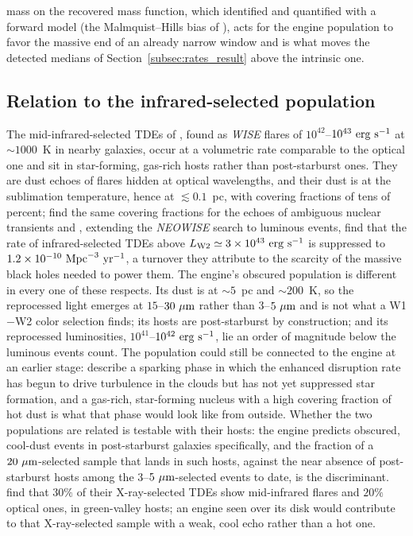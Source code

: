\documentclass[twocolumn,pdftex]{aastex701}
\newcommand{\um}{\mu{\rm m}\xspace}
\newcommand{\wise}{{\it WISE}\xspace}
\newcommand{\neowise}{{\it NEOWISE}\xspace}
\begin{document}
mass on the recovered mass function, which \citet{Ramsden:2022a} identified and \citet{Ramsden:2025a} quantified with a forward model (the Malmquist--Hills bias of \citealt{Mummery:2026a}), acts for the engine population to favor the massive end of an already narrow window and is what moves the detected medians of Section~\ref{subsec:rates_result} above the intrinsic one.

\subsection{Relation to the infrared-selected population}\label{subsec:irpop}

The mid-infrared-selected TDEs of \citet{Masterson:2024a}, found as \wise flares of $10^{42}$--$10^{43}~{\rm erg~s^{-1}}$ at $\sim 1000$~K in nearby galaxies, occur at a volumetric rate comparable to the optical one and sit in star-forming, gas-rich hosts rather than post-starburst ones. They are dust echoes of flares hidden at optical wavelengths, and their dust is at the sublimation temperature, hence at $\lesssim 0.1$~pc, with covering fractions of tens of percent; \citet{Hinkle:2024b} find the same covering fractions for the echoes of ambiguous nuclear transients and \citet{Nair:2026a}, extending the \neowise search to luminous events, find that the rate of infrared-selected TDEs above $L_{\rm W2} \simeq 3 \times 10^{43}~{\rm erg~s^{-1}}$ is suppressed to $1.2 \times 10^{-10}~{\rm Mpc}^{-3}~{\rm yr}^{-1}$, a turnover they attribute to the scarcity of the massive black holes needed to power them. The engine's obscured population is different in every one of these respects. Its dust is at $\sim 5$~pc and $\sim 200$~K, so the reprocessed light emerges at $15$--$30~\um$ rather than $3$--$5~\um$ and is not what a W1$-$W2 color selection finds; its hosts are post-starburst by construction; and its reprocessed luminosities, $10^{41}$--$10^{42}~{\rm erg~s^{-1}}$, lie an order of magnitude below the luminous events \citet{Nair:2026a} count. The \citet{Masterson:2024a} population could still be connected to the engine at an earlier stage: \citet{Guillochon:2026a} describe a sparking phase in which the enhanced disruption rate has begun to drive turbulence in the clouds but has not yet suppressed star formation, and a gas-rich, star-forming nucleus with a high covering fraction of hot dust is what that phase would look like from outside. Whether the two populations are related is testable with their hosts: the engine predicts obscured, cool-dust events in post-starburst galaxies specifically, and the fraction of a $20~\um$-selected sample that lands in such hosts, against the near absence of post-starburst hosts among the $3$--$5~\um$-selected events to date, is the discriminant. \citet{Grotova:2025a} find that $30\%$ of their X-ray-selected TDEs show mid-infrared flares and $20\%$ optical ones, in green-valley hosts; an engine seen over its disk would contribute to that X-ray-selected sample with a weak, cool echo rather than a hot one.
\end{document}
